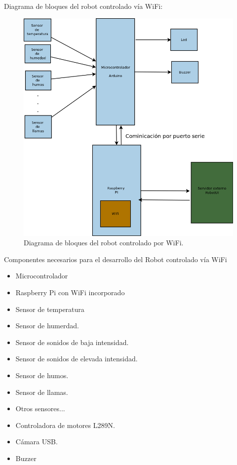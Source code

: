Diagrama de bloques del robot controlado vía WiFi:

\begin{figure}[H]
  \begin{center}
    \includegraphics[scale=0.3]{diagramas/diagrama_bloques_robot.png}
  \end{center}
  \caption{Diagrama de bloques del robot controlado por WiFi.}
  \label{figura:diagrama-bloques-robot}
\end{figure}


Componentes necesarios para el desarrollo del Robot controlado vía WiFi

\begin{itemize}
 \item Microcontrolador
 \item Raspberry Pi con WiFi incorporado
 \item Sensor de temperatura
 \item Sensor de humerdad.
 \item Sensor de sonidos de baja intensidad.
 \item Sensor de sonidos de elevada intensidad.
 \item Sensor de humos.
 \item Sensor de llamas.
 \item Otros sensores...
 \item Controladora de motores L289N.
 \item Cámara USB.
 \item Buzzer
\end{itemize}


